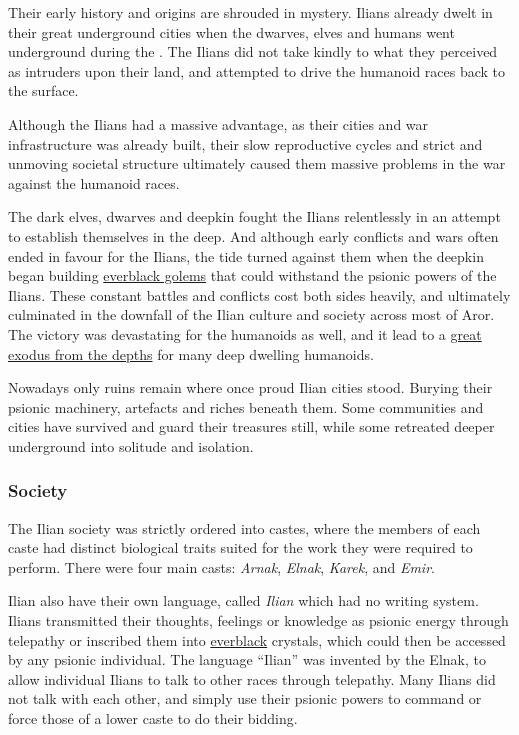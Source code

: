 Their early history and origins are shrouded in mystery. Ilians already dwelt
in their great underground cities when the dwarves, elves and humans went
underground during the . The Ilians did not take kindly to
what they perceived as intruders upon their land, and attempted to drive the
humanoid races back to the surface.

Although the Ilians had a massive advantage, as their cities and war
infrastructure was already built, their slow reproductive cycles and strict
and unmoving societal structure ultimately caused them massive problems in
the war against the humanoid races.

The dark elves, dwarves and deepkin fought the Ilians relentlessly in an
attempt to establish themselves in the deep. And although early conflicts and
wars often ended in favour for the Ilians, the tide turned against them when
the deepkin began building \hyperref[sec:Everblack Golem]{everblack golems}
that could withstand the psionic powers of the Ilians. These constant battles
and conflicts cost both sides heavily, and ultimately culminated in the
downfall of the Ilian culture and society across most of Aror. The victory was
devastating for the humanoids as well, and it lead to a \hyperref[sec:Exodus
  from the Depths]{great exodus from the depths} for many deep dwelling
humanoids.

Nowadays only ruins remain where once proud Ilian cities stood. Burying their
psionic machinery, artefacts and riches beneath them. Some communities and
cities have survived and guard their treasures still, while some retreated
deeper underground into solitude and isolation.

\subsubsection{Society}

The Ilian society was strictly ordered into castes, where the members of each
caste had distinct biological traits suited for the work they were required to
perform. There were four main casts: \emph{Arnak}, \emph{Elnak}, \emph{Karek},
and \emph{Emir}.

Ilian also have their own language, called \emph{Ilian} which had no writing
system. Ilians transmitted their thoughts, feelings or knowledge as psionic
energy through telepathy or inscribed them into
\hyperref[sec:Everblack]{everblack} crystals, which could then be accessed by
any psionic individual. The language ``Ilian'' was invented by the Elnak, to
allow individual Ilians to talk to other races through telepathy. Many Ilians
did not talk with each other, and simply use their psionic powers to command
or force those of a lower caste to do their bidding.

